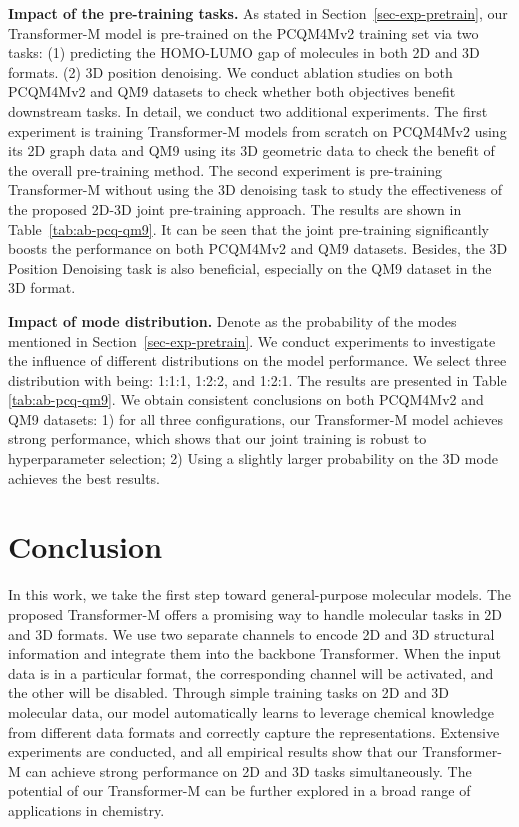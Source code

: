 \documentclass{article} \usepackage[dvipsnames]{xcolor}
\begin{document}
 \textbf{Impact of the pre-training tasks.} As stated in Section~\ref{sec-exp-pretrain}, our Transformer-M model is pre-trained on the PCQM4Mv2 training set via two tasks: (1) predicting the HOMO-LUMO gap of molecules in both 2D and 3D formats. (2) 3D position denoising. We conduct ablation studies on both PCQM4Mv2 and QM9 datasets to check whether both objectives benefit downstream tasks. In detail, we conduct two additional experiments. The first experiment is training Transformer-M models from scratch on PCQM4Mv2 using its 2D graph data and QM9 using its 3D geometric data to check the benefit of the overall pre-training method. The second experiment is pre-training Transformer-M without using the 3D denoising task to study the effectiveness of the proposed 2D-3D joint pre-training approach. The results are shown in Table~\ref{tab:ab-pcq-qm9}. It can be seen that the joint pre-training significantly boosts the performance on both PCQM4Mv2 and QM9 datasets. Besides, the 3D Position Denoising task is also beneficial, especially on the QM9 dataset in the 3D format.

\textbf{Impact of mode distribution.} Denote  as the probability of the modes mentioned in Section~\ref{sec-exp-pretrain}. We conduct experiments to investigate the influence of different distributions on the model performance. We select three distribution with  being: 1:1:1, 1:2:2, and 1:2:1. The results are presented in Table \ref{tab:ab-pcq-qm9}. We obtain consistent conclusions on both PCQM4Mv2 and QM9 datasets: 1) for all three configurations, our Transformer-M model achieves strong performance, which shows that our joint training is robust to hyperparameter selection; 2) Using a slightly larger probability on the 3D mode achieves the best results.
\vspace{-4pt}
\section{Conclusion}
\label{sec-conclusion}
\vspace{-4pt}
In this work, we take the first step toward general-purpose molecular models. The proposed Transformer-M offers a promising way to handle molecular tasks in 2D and 3D formats. We use two separate channels to encode 2D and 3D structural information and integrate them into the backbone Transformer. When the input data is in a particular format, the corresponding channel will be activated, and the other will be disabled. Through simple training tasks on 2D and 3D molecular data, our model automatically learns to leverage chemical knowledge from different data formats and correctly capture the representations. Extensive experiments are conducted, and all empirical results show that our Transformer-M can achieve strong performance on 2D and 3D tasks simultaneously. The potential of our Transformer-M can be further explored in a broad range of applications in chemistry.
\end{document}
